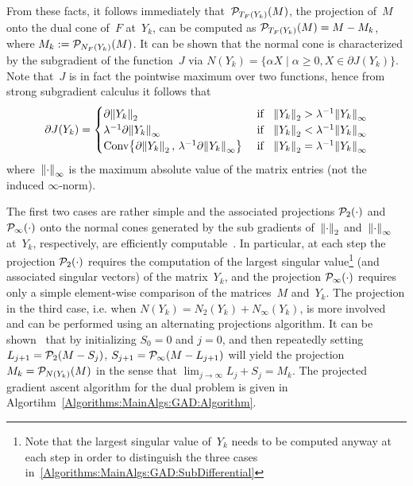 \documentclass{../../common/projectreport}
\begin{document}
From these facts, it follows immediately that~${\mathcal{P}}_{T_F(Y_k)}(M)$, the projection of~$M$ onto the dual cone of~$F$ at~$Y_k$, can be computed as ${\mathcal{P}}_{T_F(Y_k)}(M) = M - M_k$, where $M_k := {\mathcal{P}}_{N_F(Y_k)}(M)$. It can be shown that the normal cone is characterized by the subgradient of the function~$J$ via $N(Y_k) = \{\alpha X \mid \alpha \geq0, X\in \partial J(Y_k) \}$. Note that~$J$ is in fact the pointwise maximum over two functions, hence from strong subgradient calculus it follows that
%
\begin{align}
\partial J(Y_k) = \begin{cases}  
\partial {\left\|Y_k\right\|}_{2}^{} &\text{ if }\;\; {\left\|Y_k\right\|}_{2}^{} > \lambda^{-1}{\left\|Y_k\right\|}_{\infty}^{} \\
\lambda^{-1} \partial {\left\|Y_k\right\|}_{\infty}^{} &\text{ if }\;\;  {\left\|Y_k\right\|}_{2}^{} < \lambda^{-1}{\left\|Y_k\right\|}_{\infty}^{} \\
\operatorname{Conv}\!\left\{\partial {\left\|Y_k\right\|}_{2}^{} \,,\, \lambda^{-1}\partial {\left\|Y_k\right\|}_{\infty}^{}\right\} &\text{ if }\;\; {\left\|Y_k\right\|}_{2}^{} = \lambda^{-1}{\left\|Y_k\right\|}_{\infty}^{} \\
\end{cases}
\label{Algorithms:MainAlgs:GAD:SubDifferential}
\end{align}
%
where~${\left\|\cdot\right\|}_{\infty}^{}$ is the maximum absolute value of the matrix entries (not the induced $\infty$-norm). 

The first two cases are rather simple and the associated projections ${\mathcal{P}}_{2}(\cdot)$ and ${\mathcal{P}}_{\infty}(\cdot)$ onto the normal cones generated by the sub gradients of~${\left\|\cdot\right\|}_{2}^{}$ and~${\left\|\cdot\right\|}_{\infty}^{}$ at~$Y_k$, respectively,  are efficiently computable~\cite{Lin:2009kx}. In particular, at each step the projection ${\mathcal{P}}_{2}(\cdot)$ requires the computation of the largest singular value\footnote{Note that the largest singular value of~$Y_k$ needs to be computed anyway at each step in order to distinguish the three cases in~\eqref{Algorithms:MainAlgs:GAD:SubDifferential}} (and associated singular vectors) of the matrix~$Y_k$, and the projection ${\mathcal{P}}_{\infty}(\cdot)$ requires only a simple element-wise comparison of the matrices~$M$ and~$Y_k$. The projection in the third case, i.e. when $N(Y_k) = N_2(Y_k) + N_\infty(Y_k)$, is more involved and can be performed using an alternating projections algorithm. It can be shown~\cite{Lin:2009kx} that by initializing $S_0 = 0$ and $j=0$, and then repeatedly setting $L_{j+1} = {\mathcal{P}}_{2}(M-S_j)$, $S_{j+1} = {\mathcal{P}}_{\infty}(M-L_{j+1})$ will yield the projection~$M_k = {\mathcal{P}}_{N(Y_k)}(M)$ in the sense that $\lim_{j\rightarrow \infty} L_j+S_j = M_k$. The projected gradient ascent algorithm for the dual problem is given in Algortihm~\eqref{Algorithms:MainAlgs:GAD:Algorithm}.
\end{document}
